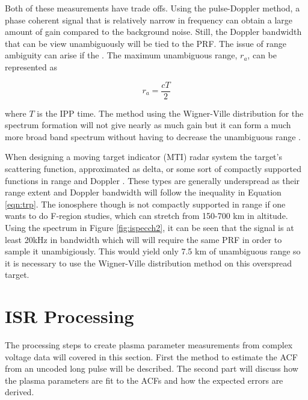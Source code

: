 Both of these measurements have trade offs. Using the pulse-Doppler method, a phase coherent signal that is relatively narrow in frequency can obtain a large amount of gain compared to the background noise. Still, the Doppler bandwidth that can be view unambiguously will be tied to the PRF. The issue of range ambiguity can arise if the . The maximum unambiguous range, $r_a$, can be represented as 

\begin{equation}
\label{eqn:maxuar}
r_a =  \frac{cT}{2}
\end{equation}

\noindent where $T$ is the IPP time. The method using the Wigner-Ville distribution for the spectrum formation will not give nearly as much gain but it can form a much more broad band spectrum without having to decrease the unambiguous range \cite{richards2014fundamentals}.

When designing a moving target indicator (MTI) radar system the target's scattering function, approximated as delta, or some sort of compactly supported functions in range and Doppler \cite{richards2014fundamentals}. These types are generally underspread as their range extent and Doppler bandwidth will follow the inequality in Equation \ref{eqn:trp}. The ionosphere though is not compactly supported in range if one wants to do F-region studies, which can stretch from 150-700 km in altitude. Using the spectrum in Figure \ref{fig:ispecch2}, it can be seen that the signal is at least 20kHz in bandwidth which will will require the same PRF in order to sample it unambigiously. This would yield only 7.5 km of unambiguous range so it is necessary to use the Wigner-Ville distribution method on this overspread target. 





\section{ISR Processing}
\label{section:isrproc}
The processing steps to create plasma parameter measurements from complex voltage data will covered in this section. First the method to estimate the ACF from an uncoded long pulse will be described. The second part will discuss how the plasma parameters are fit to the ACFs and how the expected errors are derived. 
 

